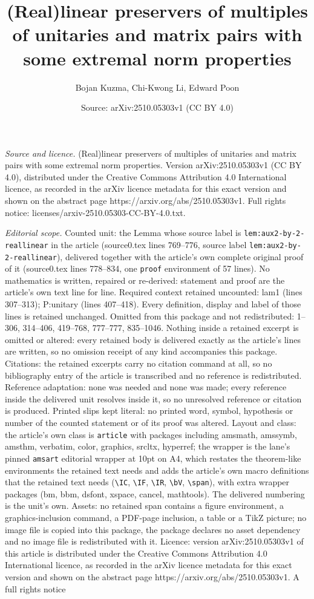 \documentclass[10pt,a4paper]{amsart}
\title[(Real)linear preservers of multiples of unitaries and matrix]{(Real)linear preservers of multiples of unitaries and matrix pairs with some extremal norm properties}
\author{Bojan Kuzma, Chi-Kwong Li, Edward Poon}
\date{Source: arXiv:2510.05303v1 (CC BY 4.0)}
\begin{document}
\maketitle

\noindent\emph{Source and licence.} (Real)linear preservers of multiples of unitaries and matrix pairs with some extremal norm properties. Version arXiv:2510.05303v1 (CC BY 4.0), distributed under the Creative Commons Attribution 4.0 International licence, as recorded in the arXiv licence metadata for this exact version and shown on the abstract page https://arxiv.org/abs/2510.05303v1. Full rights notice: licenses/arxiv-2510.05303-CC-BY-4.0.txt.\par\smallskip

\noindent\textit{Editorial scope.} Counted unit: the Lemma whose source label is \texttt{lem:aux2-by-2-reallinear} in the article (source0.tex lines 769--776, source label \texttt{lem:aux2-by-2-reallinear}), delivered together with the article's own complete original proof of it (source0.tex lines 778--834, one \texttt{proof} environment of 57 lines). No mathematics is written, repaired or re-derived: statement and proof are the article's own text line for line. Required context retained uncounted: lam1 (lines 307--313); P:unitary (lines 407--418). Every definition, display and label of those lines is retained unchanged. Omitted from this package and not redistributed: 1--306, 314--406, 419--768, 777--777, 835--1046. Nothing inside a retained excerpt is omitted or altered: every retained body is delivered exactly as the article's lines are written, so no omission receipt of any kind accompanies this package. Citations: the retained excerpts carry no citation command at all, so no bibliography entry of the article is transcribed and no reference is redistributed. Reference adaptation: none was needed and none was made; every reference inside the delivered unit resolves inside it, so no unresolved reference or citation is produced. Printed slips kept literal: no printed word, symbol, hypothesis or number of the counted statement or of its proof was altered. Layout and class: the article's own class is \texttt{article} with packages including amsmath, amssymb, amsthm, verbatim, color, graphics, srcltx, hyperref; the wrapper is the lane's pinned \texttt{amsart} editorial wrapper at 10pt on A4, which restates the theorem-like environments the retained text needs and adds the article's own macro definitions that the retained text needs (\texttt{\textbackslash IC}, \texttt{\textbackslash IF}, \texttt{\textbackslash IR}, \texttt{\textbackslash bV}, \texttt{\textbackslash span}), with extra wrapper packages (bm, bbm, dsfont, xspace, cancel, mathtools). The delivered numbering is the unit's own. Assets: no retained span contains a figure environment, a graphics-inclusion command, a PDF-page inclusion, a table or a TikZ picture; no image file is copied into this package, the package declares no asset dependency and no image file is redistributed with it. Licence: version arXiv:2510.05303v1 of this article is distributed under the Creative Commons Attribution 4.0 International licence, as recorded in the arXiv licence metadata for this exact version and shown on the abstract page https://arxiv.org/abs/2510.05303v1. A full rights notice 
\end{document}
